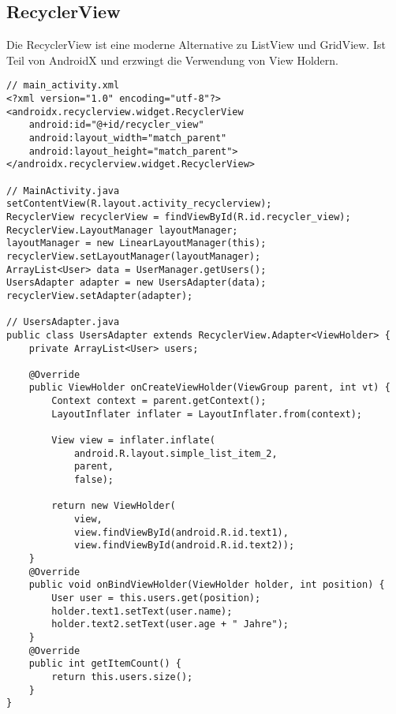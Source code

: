 \subsection{RecyclerView}
Die RecyclerView ist eine moderne Alternative zu ListView und GridView. Ist Teil von AndroidX und erzwingt die Verwendung von View Holdern.
\begin{lstlisting}
// main_activity.xml
<?xml version="1.0" encoding="utf-8"?>
<androidx.recyclerview.widget.RecyclerView
    android:id="@+id/recycler_view"
    android:layout_width="match_parent"
    android:layout_height="match_parent">
</androidx.recyclerview.widget.RecyclerView>

// MainActivity.java
setContentView(R.layout.activity_recyclerview);
RecyclerView recyclerView = findViewById(R.id.recycler_view);
RecyclerView.LayoutManager layoutManager;
layoutManager = new LinearLayoutManager(this);
recyclerView.setLayoutManager(layoutManager);
ArrayList<User> data = UserManager.getUsers();
UsersAdapter adapter = new UsersAdapter(data);
recyclerView.setAdapter(adapter);

// UsersAdapter.java
public class UsersAdapter extends RecyclerView.Adapter<ViewHolder> {
    private ArrayList<User> users;

    @Override
    public ViewHolder onCreateViewHolder(ViewGroup parent, int vt) {
        Context context = parent.getContext();
        LayoutInflater inflater = LayoutInflater.from(context);

        View view = inflater.inflate(
            android.R.layout.simple_list_item_2,
            parent,
            false);

        return new ViewHolder(
            view,
            view.findViewById(android.R.id.text1),
            view.findViewById(android.R.id.text2));
    }
    @Override
    public void onBindViewHolder(ViewHolder holder, int position) {
        User user = this.users.get(position);
        holder.text1.setText(user.name);
        holder.text2.setText(user.age + " Jahre");
    }
    @Override
    public int getItemCount() {
        return this.users.size();
    }
}
\end{lstlisting}